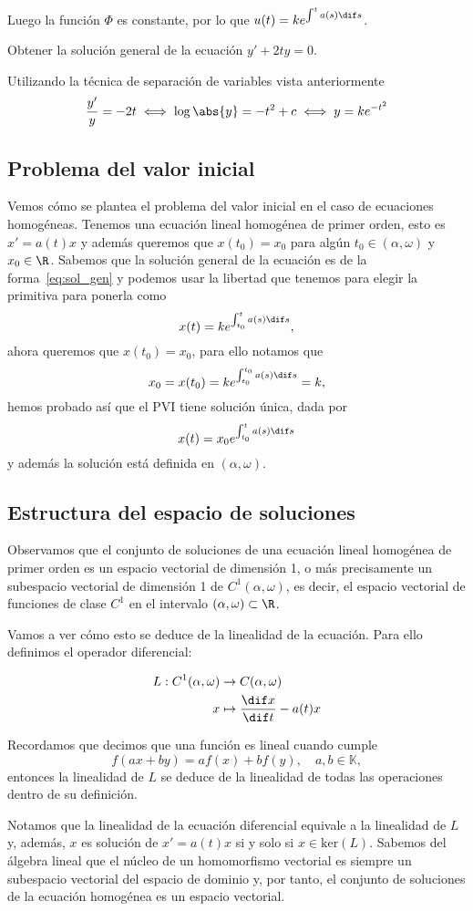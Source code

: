 \documentclass[../main.tex]{subfiles}
\begin{document}
Luego la función \(\Phi\) es constante, por lo que 
\(u(t) = k e^{\int^t a(s) \dif s}\).

\begin{example}
	Obtener la solución general de la ecuación \(y' + 2ty = 0\).
\end{example}

\begin{solution}
	Utilizando la técnica de separación de variables vista anteriormente
	\[\frac{y'}{y} = -2t \iff \log\abs{y} = -t^2 + c \iff y = k e^{-t^2}\]
\end{solution}

\subsection{Problema del valor inicial}

Vemos cómo se plantea el problema del valor inicial en el caso de ecuaciones
homogéneas. Tenemos una ecuación lineal homogénea de primer orden, esto es
\(x' = a(t)x\) y además queremos que \(x(t_0) = x_0\) para algún 
\(t_0 \in (\alpha, \omega)\) y \(x_0 \in \R\). 
Sabemos que la solución general de la ecuación es de la forma~\eqref{eq:sol_gen}
y podemos usar la libertad que tenemos para elegir la primitiva para ponerla como
\[x(t) = k e^{\int_{t_0}^t a(s) \dif s},\]
ahora queremos que \(x(t_0) = x_0\), para ello notamos que
\[x_0 = x(t_0) = k e^{\int_{t_0}^{t_0} a(s) \dif s} = k,\]
hemos probado así que el PVI tiene solución única, dada por
\[x(t) = x_0 e^{\int_{t_0}^t a(s) \dif s}\]
y además la solución está definida en \((\alpha, \omega)\).

\subsection{Estructura del espacio de soluciones}

Observamos que el conjunto de soluciones de una ecuación lineal homogénea de
primer orden es un espacio vectorial de dimensión 1, o más precisamente un
subespacio vectorial de dimensión 1 de \(C^1(\alpha, \omega)\), es decir, el
espacio vectorial de funciones de clase \(C^1\) en el intervalo
\((\alpha, \omega) \subset \R\).

Vamos a ver cómo esto se deduce de la linealidad de la ecuación. Para ello
definimos el operador diferencial:

\begin{align*}
  L : C^1(\alpha, \omega) &\to C(\alpha, \omega) \\
  x &\mapsto \frac{\dif x}{\dif t} - a(t)x
\end{align*}

Recordamos que decimos que una función es lineal cuando cumple
\[f(ax + by) = af(x) + bf(y), \quad a, b \in \mathbb{K},\]
entonces la linealidad de \(L\) se deduce de la linealidad de todas las
operaciones dentro de su definición.

Notamos que la linealidad de la ecuación diferencial equivale a la linealidad de
\(L\) y, además, \(x\) es solución de \(x' = a(t)x\) si y solo si
\(x \in \text{ker}(L)\). Sabemos del álgebra lineal que el núcleo de un
homomorfismo vectorial es siempre un subespacio vectorial del espacio de dominio
y, por tanto, el conjunto de soluciones de la ecuación homogénea es un espacio
vectorial.
\end{document}
